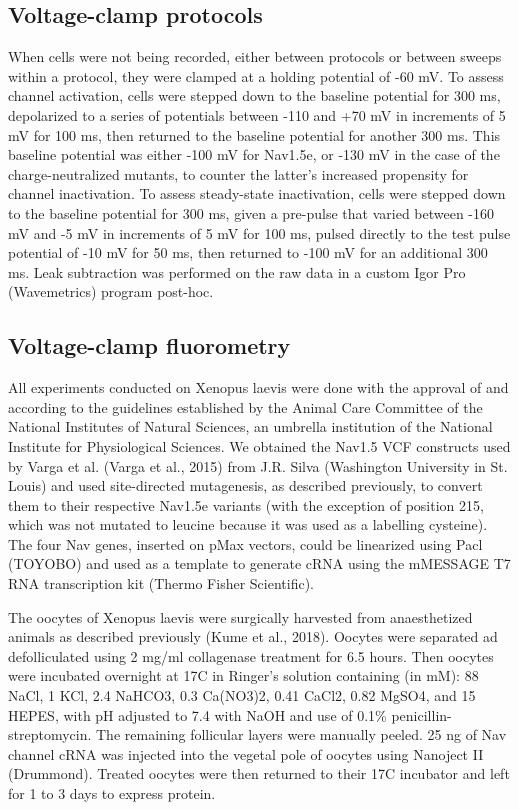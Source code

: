 \subsection{Voltage-clamp protocols}
When cells were not being recorded, either between protocols or between sweeps within a protocol, they were clamped at a holding potential of -60 mV. To assess channel activation, cells were stepped down to the baseline potential for 300 ms, depolarized to a series of potentials between -110 and +70 mV in increments of 5 mV for 100 ms, then returned to the baseline potential for another 300 ms. This baseline potential was either -100 mV for Nav1.5e, or -130 mV in the case of the charge-neutralized mutants, to counter the latter’s increased propensity for channel inactivation. To assess steady-state inactivation, cells were stepped down to the baseline potential for 300 ms, given a pre-pulse that varied between -160 mV and -5 mV in increments of 5 mV for 100 ms, pulsed directly to the test pulse potential of -10 mV for 50 ms, then returned to -100 mV for an additional 300 ms. Leak subtraction was performed on the raw data in a custom Igor Pro (Wavemetrics) program post-hoc. 

\subsection{Voltage-clamp fluorometry}
All experiments conducted on Xenopus laevis were done with the approval of and according to the guidelines established by the Animal Care Committee of the National Institutes of Natural Sciences, an umbrella institution of the National Institute for Physiological Sciences. We obtained the Nav1.5 VCF constructs used by Varga et al. (Varga et al., 2015) from J.R. Silva (Washington University in St. Louis) and used site-directed mutagenesis, as described previously, to convert them to their respective Nav1.5e variants (with the exception of position 215, which was not mutated to leucine because it was used as a labelling cysteine). The four Nav genes, inserted on pMax vectors, could be linearized using Pacl (TOYOBO) and used as a template to generate cRNA using the mMESSAGE T7 RNA transcription kit (Thermo Fisher Scientific). 

The oocytes of Xenopus laevis were surgically harvested from anaesthetized animals as described previously (Kume et al., 2018). Oocytes were separated ad defolliculated using 2 mg/ml collagenase treatment for 6.5 hours. Then oocytes were incubated overnight at 17\textdegree C in Ringer’s solution containing (in mM): 88 NaCl, 1 KCl, 2.4 NaHCO3, 0.3 Ca(NO3)2, 0.41 CaCl2, 0.82 MgSO4, and 15 HEPES, with pH adjusted to 7.4 with NaOH and use of 0.1\% penicillin-streptomycin. The remaining follicular layers were manually peeled. 25 ng of Nav channel cRNA was injected into the vegetal pole of oocytes using Nanoject II (Drummond). Treated oocytes were then returned to their 17\textdegree C incubator and left for 1 to 3 days to express protein.

